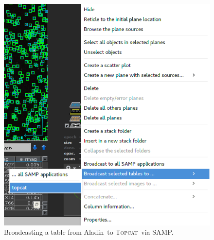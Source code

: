 \documentclass [a4paper, 12pt]{article}
\newcommand{\aladin}{{\textsc{A}{ladin}}}
\newcommand{\topcat}{{\textsc{Topcat}}}
\begin{document}
\begin{itemize}
\begin{figure}[H]
        \center
        \includegraphics[width=0.75 
        \textwidth]{../images/aladin_send_table_topcat.png}
        \caption{Broadcasting a table from \aladin\ to \topcat\ via SAMP. }
        \label{fig:broadcast_aladin_topcat}
    \end{figure}
\end{itemize}
\end{document}
